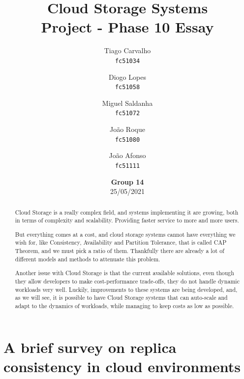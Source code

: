 \documentclass[14pt,oneside]{extreport}
\title{\textbf{Cloud Storage Systems} \\
       \large Project - Phase 10 Essay}
\date{\textbf{Group 14} \\ 25/05/2021}
\author{
Tiago Carvalho    \\
\texttt{fc51034}  \and
Diogo Lopes       \\
\texttt{fc51058}  \and
Miguel Saldanha   \\ 
\texttt{fc51072}  \and
João Roque        \\ 
\texttt{fc51080}  \and
João Afonso       \\ 
\texttt{fc51111}
}
\newcommand*\fpar{\hspace{1ex}}
\begin{document}
\maketitle

\begin{abstract}
  \fpar Cloud Storage is a really complex field, and systems implementing it are growing, both in terms of complexity and scalability. Providing faster service to more and more users. 
  \par But everything comes at a cost, and cloud storage systems cannot have everything we wish for, like Consistency, Availability and Partition Tolerance, that is called CAP Theorem, and we must pick a ratio of them. Thankfully there are already a lot of different models and methods to attenuate this problem.
  \par Another issue with Cloud Storage is that the current available solutions, even though they allow developers to make cost-performance trade-offs, they do not handle dynamic workloads very well. Luckily, improvements to these systems are being developed, and, as we will see, it is possible to have Cloud Storage systems that can auto-scale and adapt to the dynamics of workloads, while managing to keep costs as low as possible.
\end{abstract}

\chapter{\Large{A brief survey on replica consistency in cloud environments \cite{paper1}}}
\vspace{-2em}
\end{document}
